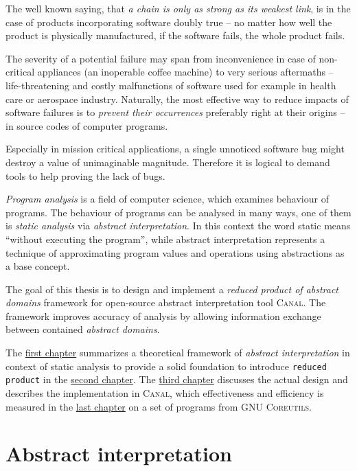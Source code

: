 \documentclass[12pt,oneside]{fithesis2}
\theoremstyle{definition}
\begin{document}
The well known saying, that \textit{a chain is only as strong as its weakest link}, is in the case of products incorporating software doubly true -- no matter how well the product is physically manufactured, if the software fails, the whole product fails.

The severity of a potential failure may span from inconvenience in case of non-critical appliances (an inoperable coffee machine) to very serious aftermaths -- life-threatening and costly malfunctions of software used for example in health care or aerospace industry. Naturally, the most effective way to reduce impacts of software failures is to \textit{prevent their occurrences} preferably right at their origins -- in source codes of computer programs.

Especially in mission critical applications, a single unnoticed software bug might destroy a value of unimaginable magnitude. Therefore it is logical to demand tools to help proving the lack of bugs.

\textit{Program analysis} is a field of computer science, which examines behaviour of programs. The behaviour of programs can be analysed in many ways, one of them is \textit{static analysis} via \textit{abstract interpretation}. In this context the word static means ``without executing the program'', while abstract interpretation represents a technique of approximating program values and operations using abstractions as a base concept.

The goal of this thesis is to design and implement a \textit{reduced product of abstract domains} framework for open-source abstract interpretation tool \textsc{Canal}. The framework improves accuracy of analysis by allowing information exchange between contained \textit{abstract domains}.

The \hyperref[ch:abstract-interpretation]{first chapter} summarizes a theoretical framework of \textit{abstract interpretation} in context of static analysis to provide a solid foundation to introduce \texttt{reduced product} in the \hyperref[ch:reduced-product]{second chapter}. The \hyperref[ch:implementation]{third chapter} discusses the actual design and describes the implementation in \textsc{Canal}, which effectiveness and efficiency is measured in the \hyperref[ch:measurements]{last chapter} on a set of programs from \textsc{GNU Coreutils}.

\chapter{Abstract interpretation}\label{ch:abstract-interpretation}
\end{document}
